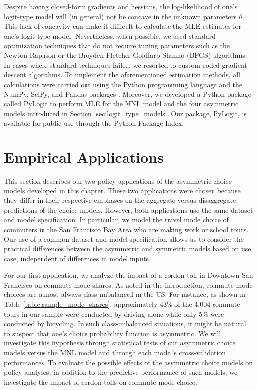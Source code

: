 Despite having closed-form gradients and hessians, the log-likelihood of one's logit-type model will (in general) not be concave in the unknown parameters $\theta$. This lack of concavity can make it difficult to calculate the MLE estimates for one's logit-type model. Nevertheless, when possible, we used standard optimization techniques that do not require tuning parameters such as the Newton-Raphson or the Broyden-Fletcher-Goldfarb-Shanno (BFGS) algorithms. In cases where standard techniques failed, we resorted to custom-coded gradient descent algorithms. To implement the aforementioned estimation methods, all calculations were carried out using the Python programming language and the NumPy, SciPy, and Pandas packages \citep{mckinney_data_2010, van_numpy_2011, jones_scipy_2014}. Moreover, we developed a Python package called PyLogit to perform MLE for the MNL model and the four asymmetric models introduced in Section \ref{sec:logit_type_models}. Our package, PyLogit, is available for public use through the Python Package Index.

\section{Empirical Applications}
\label{sec:empirical_applications}

This section describes our two policy applications of the asymmetric choice models developed in this chapter. These two applications were chosen because they differ in their respective emphases on the aggregate versus disaggregate predictions of the choice models. However, both applications use the same dataset and model specification. In particular, we model the travel mode choice of commuters in the San Francisco Bay Area who are making work or school tours. Our use of a common dataset and model specification allows us to consider the practical differences between the asymmetric and symmetric models based on use case, independent of differences in model inputs.

For our first application, we analyze the impact of a cordon toll in Downtown San Francisco on commute mode shares. As noted in the introduction, commute mode choices are almost always class imbalanced in the US. For instance, as shown in Table \ref{table:sample_mode_shares}, approximately 43\% of the 4,004 commute tours in our sample were conducted by driving alone while only 5\% were conducted by bicycling. In such class-imbalanced situations, it might be natural to suspect that one's choice probability function is asymmetric. We will investigate this hypothesis through statistical tests of our asymmetric choice models versus the MNL model and through each model's cross-validation performances. To evaluate the possible effects of the asymmetric choice models on policy analyses, in addition to the predictive performance of such models, we investigate the impact of cordon tolls on commute mode choice.

